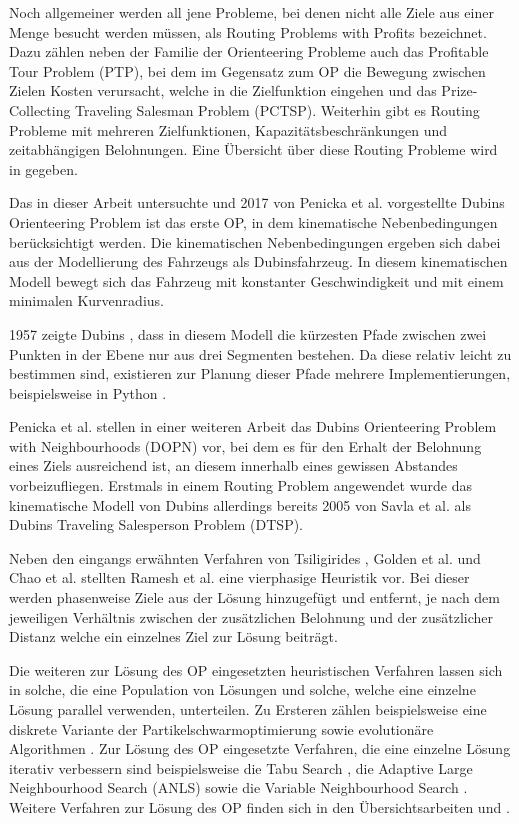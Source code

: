 \documentclass[12pt,a4paper,twoside]{article}
\theoremstyle{definition}
\numberwithin{equation}{section}
\begin{document}
Noch allgemeiner werden all jene Probleme, bei denen nicht alle Ziele aus einer Menge besucht werden müssen, als Routing Problems with Profits bezeichnet. Dazu zählen neben der Familie der Orienteering Probleme auch das Profitable Tour Problem (PTP), bei dem im Gegensatz zum OP die Bewegung zwischen Zielen Kosten verursacht, welche in die Zielfunktion eingehen und das Prize-Collecting Traveling Salesman Problem (PCTSP). Weiterhin gibt es Routing Probleme mit mehreren Zielfunktionen, Kapazitätsbeschränkungen und zeitabhängigen Belohnungen. Eine Übersicht über diese Routing Probleme wird in \cite{Vansteenwegen.2019} gegeben.

Das in dieser Arbeit untersuchte und 2017 von Penicka et al. \cite{R.Penicka.2017} vorgestellte Dubins Orienteering Problem ist das erste OP, in dem kinematische Nebenbedingungen berücksichtigt werden. Die kinematischen Nebenbedingungen ergeben sich dabei aus der Modellierung des Fahrzeugs als Dubinsfahrzeug. In diesem kinematischen Modell bewegt sich das Fahrzeug mit konstanter Geschwindigkeit und mit einem minimalen Kurvenradius. 

1957 zeigte Dubins \cite{Dubins.1957}, dass in diesem Modell die kürzesten Pfade zwischen zwei Punkten in der Ebene nur aus drei Segmenten bestehen. Da diese relativ leicht zu bestimmen sind, existieren zur Planung dieser Pfade mehrere Implementierungen, beispielsweise in Python \cite{AtsushiSakai.2018}. 

Penicka et al. stellen in einer weiteren Arbeit \cite{R.Penicka.2017b} das Dubins Orienteering Problem with Neighbourhoods (DOPN) vor, bei dem es für den Erhalt der Belohnung eines Ziels ausreichend ist, an diesem innerhalb eines gewissen Abstandes vorbeizufliegen. Erstmals in einem Routing Problem angewendet wurde das kinematische Modell von Dubins allerdings bereits 2005 von Savla et al. \cite{K.Savla.2005} als Dubins Traveling Salesperson Problem (DTSP).

Neben den eingangs erwähnten Verfahren von Tsiligirides \cite{Tsiligirides.1984}, Golden et al. \cite{Golden.1987} und Chao et al. \cite{Chao.1996b} stellten Ramesh et al. \cite{Ramesh.1991} eine vierphasige Heuristik vor. Bei dieser werden phasenweise Ziele aus der Lösung hinzugefügt und entfernt, je nach dem jeweiligen Verhältnis zwischen der zusätzlichen Belohnung und der zusätzlicher Distanz welche ein einzelnes Ziel zur Lösung beiträgt.

Die weiteren zur Lösung des OP eingesetzten heuristischen Verfahren lassen sich in solche, die eine Population von Lösungen und solche, welche eine einzelne Lösung parallel verwenden, unterteilen. Zu Ersteren zählen beispielsweise eine diskrete Variante der Partikelschwarmoptimierung \cite{Z.Sevkli.2010} sowie evolutionäre Algorithmen \cite{Kobeaga.2018}. Zur Lösung des OP eingesetzte Verfahren, die eine einzelne Lösung iterativ verbessern sind beispielsweise die Tabu Search \cite{Gendreau.1998}, die Adaptive Large Neighbourhood Search (ANLS) \cite{Santini.2019} sowie die Variable Neighbourhood Search \cite{Sevkli.2006}. Weitere Verfahren zur Lösung des OP finden sich in den Übersichtsarbeiten \cite{Vansteenwegen.2011} und \cite{Gunawan.2016}.
\end{document}
